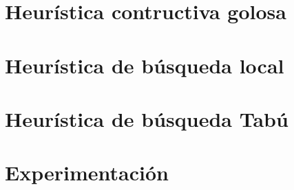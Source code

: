 \documentclass[a4paper, 10pt, twoside]{article}
\newenvironment{pseudo}[1][]{%
    \vspace{1em}%
    \begin{algorithmic}%
}
{%
    \end{algorithmic}%
    \vspace{1em}%
}
\begin{document}
\begin{pseudo}
\EndProcedure
\end{pseudo}



\newpage

\section{Heurística contructiva golosa}





\newpage

\section{Heurística de búsqueda local}




\newpage

\section{Heurística de búsqueda Tabú}




\newpage

\section{Experimentación}
\end{document}
